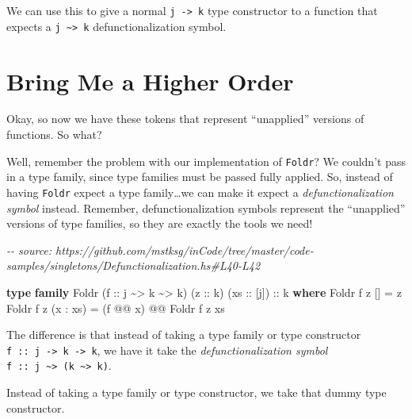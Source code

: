 \documentclass[]{article}
\newenvironment{Shaded}{}{}
\newcommand{\CommentTok}[1]{\textcolor[rgb]{0.38,0.63,0.69}{\textit{#1}}}
\newcommand{\DataTypeTok}[1]{\textcolor[rgb]{0.56,0.13,0.00}{#1}}
\newcommand{\KeywordTok}[1]{\textcolor[rgb]{0.00,0.44,0.13}{\textbf{#1}}}
\newcommand{\NormalTok}[1]{#1}
\newcommand{\OperatorTok}[1]{\textcolor[rgb]{0.40,0.40,0.40}{#1}}
\newcommand{\OtherTok}[1]{\textcolor[rgb]{0.00,0.44,0.13}{#1}}
\begin{document}
We can use this to give a normal \texttt{j\ -\textgreater{}\ k} type constructor
to a function that expects a \texttt{j\ \textasciitilde{}\textgreater{}\ k}
defunctionalization symbol.

\hypertarget{bring-me-a-higher-order}{%
\section{Bring Me a Higher Order}\label{bring-me-a-higher-order}}

Okay, so now we have these tokens that represent ``unapplied'' versions of
functions. So what?

Well, remember the problem with our implementation of \texttt{Foldr}? We
couldn't pass in a type family, since type families must be passed fully
applied. So, instead of having \texttt{Foldr} expect a type family\ldots we can
make it expect a \emph{defunctionalization symbol} instead. Remember,
defunctionalization symbols represent the ``unapplied'' versions of type
families, so they are exactly the tools we need!

\begin{Shaded}
\begin{Highlighting}[]
\CommentTok{{-}{-} source: https://github.com/mstksg/inCode/tree/master/code{-}samples/singletons/Defunctionalization.hs\#L40{-}L42}

\KeywordTok{type} \KeywordTok{family} \DataTypeTok{Foldr}\NormalTok{ (}\OtherTok{f ::}\NormalTok{ j }\OperatorTok{\textasciitilde{}>}\NormalTok{ k }\OperatorTok{\textasciitilde{}>}\NormalTok{ k) (}\OtherTok{z ::}\NormalTok{ k) (}\OtherTok{xs ::}\NormalTok{ [j])}\OtherTok{ ::}\NormalTok{ k }\KeywordTok{where}
    \DataTypeTok{Foldr}\NormalTok{ f z \textquotesingle{}[]       }\OtherTok{=}\NormalTok{ z}
    \DataTypeTok{Foldr}\NormalTok{ f z (x \textquotesingle{}}\OperatorTok{:}\NormalTok{ xs) }\OtherTok{=}\NormalTok{ (f }\OperatorTok{@@}\NormalTok{ x) }\OperatorTok{@@} \DataTypeTok{Foldr}\NormalTok{ f z xs}
\end{Highlighting}
\end{Shaded}

The difference is that instead of taking a type family or type constructor
\texttt{f\ ::\ j\ -\textgreater{}\ k\ -\textgreater{}\ k}, we have it take the
\emph{defunctionalization symbol}
\texttt{f\ ::\ j\ \textasciitilde{}\textgreater{}\ (k\ \textasciitilde{}\textgreater{}\ k)}.

Instead of taking a type family or type constructor, we take that dummy type
constructor.
\end{document}
